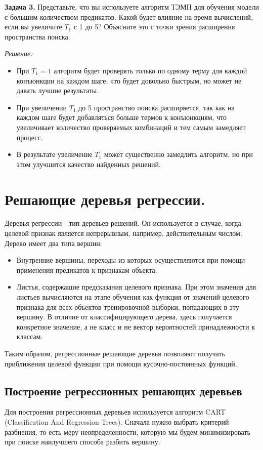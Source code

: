 \textbf{Задача 3.}
\newline
Представьте, что вы используете алгоритм ТЭМП для обучения модели с большим количеством предикатов. Какой будет влияние на время вычислений, если вы увеличите $T_1$ с 1 до 5? Объясните это с точки зрения расширения пространства поиска.

\textit{Решение:}
\begin{itemize}
    \item При $T_1 = 1$ алгоритм будет проверять только по одному терму для каждой конъюнкции на каждом шаге, что будет довольно быстрым, но может не давать лучшие результаты.
    \item При увеличении $T_1$ до 5 пространство поиска расширяется, так как на каждом шаге будет добавляться больше термов к конъюнкциям, что увеличивает количество проверяемых комбинаций и тем самым замедляет процесс.
    \item В результате увеличение $T_1$ может существенно замедлить алгоритм, но при этом улучшится качество найденных решений.
\end{itemize}

\section{Решающие деревья регрессии.}

Деревья регрессии - тип деревьев решений. Он используется в случае, когда целевой признак является непрерывным, например, действительным числом. Дерево имеет два типа вершин:
\begin{itemize}
    \item Внутренние вершины, переходы из которых осуществляются при помощи применения предикатов к признакам объекта.
    \item Листья, содержащие предсказания целевого признака. При этом значения для листьев вычисляются на этапе обучения как функция от значений целевого признака для всех объектов тренировочной выборки, попадающих в эту вершину. В отличие от классифицирующего дерева, здесь получается конкретное значение, а не класс и не вектор вероятностей принадлежности к классам.
\end{itemize}
Таким образом, регрессионные решающие деревья позволяют получать приближения целевой функции при помощи кусочно-постоянных функций.

\subsection{Построение регрессионных решающих деревьев}
Для построения регрессионных деревьев используется алгоритм CART (Classification And Regression Trees). Сначала нужно выбрать критерий разбиения, то есть меру неопределенности, которую мы будем минимизировать при поиске наилучшего способа разбить вершину.

